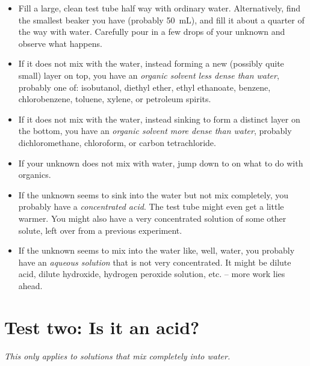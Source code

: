 \begin{itemize}
\item Fill a large, 
clean test tube half way with ordinary water. 
Alternatively, 
find the smallest beaker you have (probably 50~mL), 
and fill it about a quarter of the way with water. 
Carefully pour in a few drops of your unknown 
and observe what happens. 


\item If it does not mix with the water, 
instead forming a new (possibly quite small) layer on top, 
you have an \emph{organic solvent less dense than water}, 
probably one of: isobutanol, 
diethyl ether, 
ethyl ethanoate, 
benzene, 
chlorobenzene, 
toluene, 
xylene, 
or petroleum spirits. 

\item If it does not mix with the water, 
instead sinking to form a distinct layer on the bottom, 
you have an \emph{organic solvent more dense than water}, 
probably dichloromethane, 
chloroform, 
or carbon tetrachloride.

\item If your unknown does not mix with water, 
jump down to  on what to do with organics.

\item If the unknown seems to sink into the water but not mix completely, 
you probably have a \emph{concentrated acid}. 
The test tube might even get a little warmer. 
You might also have a very concentrated solution of some other solute, 
left over from a previous experiment.

\item If the unknown seems to mix into the water like, 
well, 
water, 
you probably have an \emph{aqueous solution} that is not very concentrated. 
It might be dilute acid, 
dilute hydroxide, 
hydrogen peroxide solution, 
etc. -- more work lies ahead.
\end{itemize}

\section{Test two: Is it an acid?}

\emph{This only applies to solutions that mix completely into water.}


